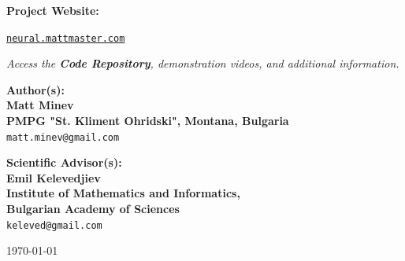 \documentclass[11pt,a4paper]{report}
\begin{document}
\begin{center}
\begin{center}
\textbf{Project Website:}

\href{https://neural.mattmaster.com/}{\texttt{neural.mattmaster.com}}

\vspace{0.3em}

{\small\itshape
Access the \textbf{Code Repository}, demonstration videos, and additional information.
}
\end{center}

\vspace{2.5em}

{\large
\textbf{Author(s):} \\[1em]
\textbf{Matt Minev}\\
\textbf{PMPG "St. Kliment Ohridski", Montana, Bulgaria}\\
\texttt{matt.minev@gmail.com}
}

\vspace{2.5em}

{\large
\textbf{Scientific Advisor(s):} \\[0.5em]
\textbf{Emil Kelevedjiev}\\
\textbf{Institute of Mathematics and Informatics,} \\
\textbf{Bulgarian Academy of Sciences}\\
\texttt{keleved@gmail.com}
}

\vspace{2.5em}

{\large\today}

\end{center}

\vspace*{\fill}

\newpage
\end{document}
